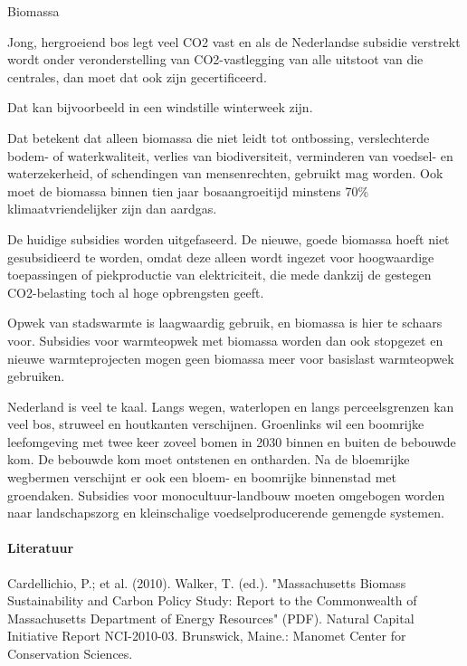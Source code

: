 \begin{voorstel}{Biomassa}
\begin{aanbevelingen}
Jong, hergroeiend bos legt veel CO2 vast en als de Nederlandse subsidie verstrekt wordt onder veronderstelling van CO2-vastlegging van alle uitstoot van die centrales, dan moet dat ook zijn gecertificeerd. 

Dat kan bijvoorbeeld in een windstille winterweek zijn.

Dat betekent dat alleen biomassa die niet leidt tot ontbossing, verslechterde bodem- of waterkwaliteit, verlies van biodiversiteit, verminderen van voedsel- en waterzekerheid, of schendingen van mensenrechten, gebruikt mag worden. Ook moet de biomassa binnen tien jaar bosaangroeitijd minstens 70\% klimaatvriendelijker zijn dan aardgas.

De huidige subsidies worden uitgefaseerd. De nieuwe, goede biomassa hoeft niet gesubsidieerd te worden, omdat deze alleen wordt ingezet voor hoogwaardige toepassingen of piekproductie van elektriciteit, die mede dankzij de gestegen CO2-belasting toch al hoge opbrengsten geeft.

Opwek van stadswarmte is laagwaardig gebruik, en biomassa is hier te schaars voor. Subsidies voor warmteopwek met biomassa worden dan ook stopgezet en nieuwe warmteprojecten mogen geen biomassa meer voor basislast warmteopwek gebruiken.

Nederland is veel te kaal. Langs wegen, waterlopen en langs perceelsgrenzen kan veel bos, struweel en houtkanten verschijnen. Groenlinks wil een boomrijke leefomgeving met twee keer zoveel bomen in 2030 binnen en buiten de bebouwde kom. De bebouwde kom moet ontstenen en ontharden. Na de bloemrijke wegbermen verschijnt er ook een bloem- en boomrijke binnenstad met groendaken. Subsidies voor monocultuur-landbouw moeten omgebogen worden naar landschapszorg en kleinschalige voedselproducerende gemengde systemen.

\end{aanbevelingen}

\paragraph{Literatuur}
Cardellichio, P.; et al. (2010). Walker, T. (ed.). "Massachusetts Biomass Sustainability and Carbon Policy Study: Report to the Commonwealth of Massachusetts Department of Energy Resources" (PDF). Natural Capital Initiative Report NCI-2010-03. Brunswick, Maine.: Manomet Center for Conservation Sciences.


\end{voorstel}
